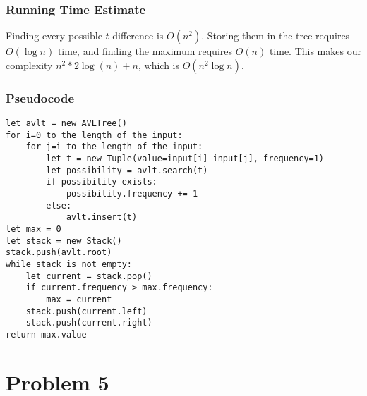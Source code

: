 \documentclass{math}
\begin{document}
\subsubsection*{Running Time Estimate}
Finding every possible \( t \) difference is \( O(n^2) \). Storing them in the
tree requires \( O(\log n) \) time, and finding the maximum requires \( O(n) \)
time. This makes our complexity \( n^2*2\log(n)+n \), which is
\( O(n^2\log n) \).

\subsubsection*{Pseudocode}
\begin{lstlisting}
let avlt = new AVLTree()
for i=0 to the length of the input:
    for j=i to the length of the input:
        let t = new Tuple(value=input[i]-input[j], frequency=1)
        let possibility = avlt.search(t)
        if possibility exists:
            possibility.frequency += 1
        else:
            avlt.insert(t)
let max = 0
let stack = new Stack()
stack.push(avlt.root)
while stack is not empty:
    let current = stack.pop()
    if current.frequency > max.frequency:
        max = current
    stack.push(current.left)
    stack.push(current.right)
return max.value
\end{lstlisting}

\section*{Problem 5}
\end{document}
